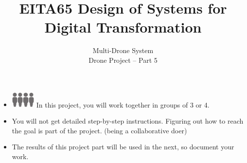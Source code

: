 \documentclass{article}
\title{EITA65 Design of Systems for Digital Transformation\\\year}
\author{\huge Multi-Drone System\\Drone Project -- Part 5}
\begin{document}
\clearpage\maketitle
\thispagestyle{empty}%

\begin{itemize}
\item \includegraphics[width=3mm]{person.png}\includegraphics[width=3mm]{person.png}\includegraphics[width=3mm]{person.png}\includegraphics[width=3mm]{person.png} In this project, you will work together in groups  of 3 or 4.  
\item You will not get detailed step-by-step instructions. Figuring out how to reach the goal is part of the project. (being a collaborative doer)
\item The results of this project part will be used in the next, so document your work.
\end{itemize}
\end{document}
